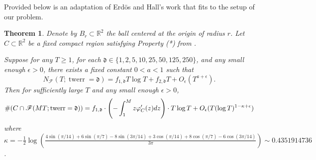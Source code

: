 \documentclass[12pt]{amsart}
\newcounter{counter}[section] %
\numberwithin{equation}{section} %
\newtheorem{theorem}[counter]{Theorem}
\theoremstyle{definition} \newtheorem{definition}[counter]{Definition}
\theoremstyle{remark} \newtheorem{nonexam}[counter]{Non-example}
\newcommand{\FF}{\mathscr{F}} %
\let\originalleft\left \let\originalright\right
\renewcommand{\left}{\mathopen{}\mathclose\bgroup\originalleft}
\renewcommand{\right}{\aftergroup\egroup\originalright}
\DeclareMathOperator{\twerr}{twerr} %
\begin{document}
Provided below is an adaptation of Erd\"os and Hall's work that fits to the setup of our problem.
\begin{theorem} \label{theorem:equidistribution}
    Denote by $B_r \subset \mathbb{R}^2$ the ball centered at the origin of radius $r$. Let $C \subset \mathbb{R}^2$ be a fixed compact region satisfying Property (*) from .
    
    Suppose for any $T \geq 1$, for each $\mathfrak{d} \in \{1, 2, 5, 10, 25, 50, 125, 250\}$, and any small enough $\epsilon > 0$, there exists a fixed constant $0 < a < 1$ such that
    \begin{equation*}
        N_{\FF}(T; \twerr = \mathfrak{d}) = f_{1,\mathfrak{d}} T \log T + f_{2,\mathfrak{d}} T + O_\epsilon(T^{a + \epsilon}).
    \end{equation*}
    Then for sufficiently large $T$ and any small enough $\epsilon > 0$,
    \begin{equation*}
        \#(C \cap \FF(MT; \twerr = \mathfrak{d})) =  f_{1,\mathfrak{d}} \cdot \left( -\int_1^M z \varphi'_C(z)dz \right) \cdot T \log T + O_\epsilon(T (\log T)^{1 - \kappa + \epsilon})
    \end{equation*}
    where $\kappa = -\frac{1}{2} \log(\frac{4 \sin(\pi/14) + 6\sin(\pi/7) - 8 \sin(3\pi/14) + 3 \cos(\pi/14) + 8 \cos(\pi/7) - 6 \cos(3\pi/14)}{3\pi}) \sim 0.4351914736$.
\end{theorem}
\end{document}
